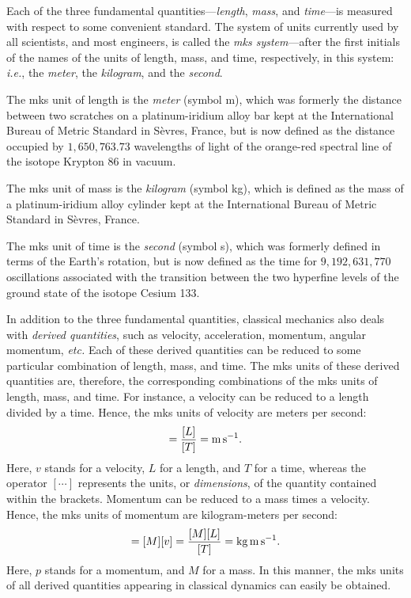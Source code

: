 Each of the three fundamental quantities---{\em length}, {\em mass}, and {\em time}---is
measured with respect to some convenient standard. The system of units
currently used by all scientists, and most engineers, is called the {\em mks system}---after
the first initials of the names of the units of length, mass, and time, respectively, in this system:
{\em i.e.}, the {\em meter}, the {\em kilogram}, and the {\em second}.

The mks unit of length is the {\em meter} (symbol m), which was formerly the distance between
two scratches on a platinum-iridium alloy bar kept at the International Bureau of Metric
Standard in S\`{e}vres, France, but is now defined as the distance occupied by
$1,650,763.73$ wavelengths of light of the orange-red spectral line of the
isotope Krypton 86 in vacuum.

The mks unit of mass is the {\em kilogram} (symbol kg), which is defined as the mass
of a  platinum-iridium alloy cylinder  kept at the International Bureau of Metric
Standard in S\`{e}vres, France.

The mks unit of time is the {\em second} (symbol s), which was formerly defined in terms of the
Earth's rotation, but is now defined as the time for $9,192,631,770$ oscillations
associated
with the transition between the two hyperfine levels of the ground state of the
isotope Cesium 133.

In addition to the three fundamental quantities, classical mechanics 
also deals with {\em derived quantities},
such as velocity, acceleration, momentum, angular momentum, {\em etc.} Each of
these derived quantities can be reduced to some particular combination of 
length, mass, and time. The mks units of these derived quantities
are, therefore, the corresponding combinations of the  mks units of length, mass, and time. 
For instance, a velocity can be reduced to a length divided by a time. Hence,
the mks units of velocity are meters per second:
\begin{equation}
[v] = \frac{[L]}{[T]} = {\rm m\,s^{-1}}.
\end{equation}
Here, $v$ stands for a velocity, $L$ for a length, and $T$ for a time, whereas the
operator $[\cdots]$ represents the units, or {\em dimensions}, of the quantity
contained within the brackets. Momentum can be reduced to a mass
times a velocity. Hence, the mks units of momentum are kilogram-meters per second:
\begin{equation}
[p] = [M][v] = \frac{[M][L]}{[T]} = {\rm kg\,m\,s^{-1}}.
\end{equation}
Here, $p$ stands for a momentum, and $M$ for a mass. In this manner, the mks units
of all derived quantities appearing  in classical dynamics can easily be obtained.

